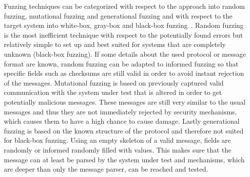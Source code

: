 Fuzzing techniques can be categorized with respect to the approach into random fuzzing, mutational fuzzing and generational fuzzing and with respect to the target system into white-box, gray-box and black-box fuzzing~\cite{neystadtPenTesting}.
Random fuzzing is the most inefficient technique with respect to the potentially found errors but relatively simple to set up and best suited for systems that are completely unknown (black-box fuzzing). If some details about the used protocol or message format are known, random fuzzing can be adapted to informed fuzzing so that specific fields such as checksums are still valid in order to avoid instant rejection of the messages.
Mutational fuzzing is based on previously captured valid communication with the system under test that is altered in order to get potentially malicious messages. These messages are still very similar to the usual messages and thus they are not immediately rejected by security mechanisms, which causes them to have a high chance to cause damage.
Lastly generational fuzzing is based on the known structure of the protocol and therefore not suited for black-box fuzzing. Using an empty skeleton of a valid message, fields are randomly or informed randomly filled with values. This makes sure that the message can at least be parsed by the system under test and mechanisms, which are deeper than only the message parser, can be reached and tested.
